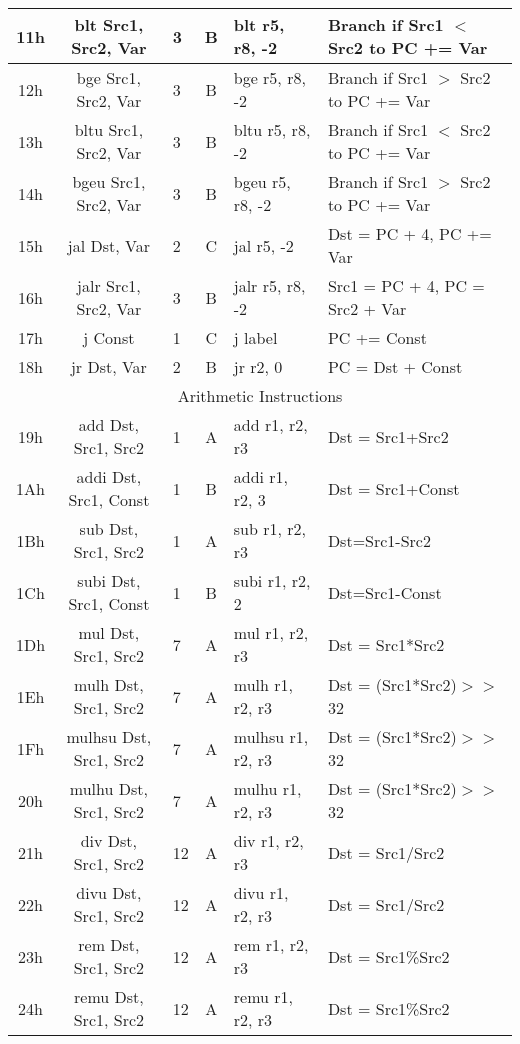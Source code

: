 \documentclass[]{article}
\begin{document}
\begin{longtable}{|c|c|l|c|l|p{5cm}|}
	\hline
	11h & blt Src1, Src2, Var & 3 & B & blt r5, r8, -2 & Branch if Src1 $<$ Src2 to PC += Var \\
	\hline
	12h & bge Src1, Src2, Var & 3 & B & bge r5, r8, -2 & Branch if Src1 $>$ Src2 to PC += Var \\
	\hline
	13h & bltu Src1, Src2, Var & 3 & B & bltu r5, r8, -2 & Branch if Src1 $<$ Src2 to PC += Var \\
	\hline
	14h & bgeu Src1, Src2, Var & 3 & B & bgeu r5, r8, -2 & Branch if Src1 $>$ Src2 to PC += Var \\
	\hline
	15h & jal Dst, Var & 2 & C & jal r5, -2 & Dst = PC + 4, PC += Var \\
	\hline
	16h & jalr Src1, Src2, Var & 3 & B & jalr r5, r8, -2 & Src1 = PC + 4, PC = Src2 + Var \\
	\hline
	17h & j Const & 1 & C & j label & PC += Const \\
	\hline
	18h & jr Dst, Var & 2 & B & jr r2, 0 & PC = Dst + Const \\
	\hline
	\multicolumn{6}{|c|}{Arithmetic Instructions} \\
	\hline
	19h & add Dst, Src1, Src2 & 1 & A & add r1, r2, r3 & Dst = Src1+Src2 \\
	\hline
	1Ah & addi Dst, Src1, Const & 1 & B & addi r1, r2, 3 & Dst = Src1+Const \\
	\hline
	1Bh & sub Dst, Src1, Src2 & 1 & A & sub r1, r2, r3 & Dst=Src1-Src2 \\
	\hline
	1Ch & subi Dst, Src1, Const & 1 & B & subi r1, r2, 2 & Dst=Src1-Const \\
	\hline
	1Dh & mul Dst, Src1, Src2 & 7 & A & mul r1, r2, r3 & Dst = Src1*Src2 \\
	\hline
	1Eh & mulh Dst, Src1, Src2 & 7 & A & mulh r1, r2, r3 & Dst = (Src1*Src2)$>>$32 \\
	\hline
	1Fh & mulhsu Dst, Src1, Src2 & 7 & A & mulhsu r1, r2, r3 & Dst = (Src1*Src2)$>>$32 \\
	\hline
	20h & mulhu Dst, Src1, Src2 & 7 & A & mulhu r1, r2, r3 & Dst = (Src1*Src2)$>>$32 \\
	\hline
	21h & div Dst, Src1, Src2 & 12 & A & div r1, r2, r3 & Dst = Src1/Src2 \\
	\hline
	22h & divu Dst, Src1, Src2 & 12 & A & divu r1, r2, r3 & Dst = Src1/Src2 \\
	\hline
	23h & rem Dst, Src1, Src2 & 12 & A & rem r1, r2, r3 & Dst = Src1\%Src2 \\
	\hline
	24h & remu Dst, Src1, Src2 & 12 & A & remu r1, r2, r3 & Dst = Src1\%Src2 \\

\end{longtable}
\end{document}
